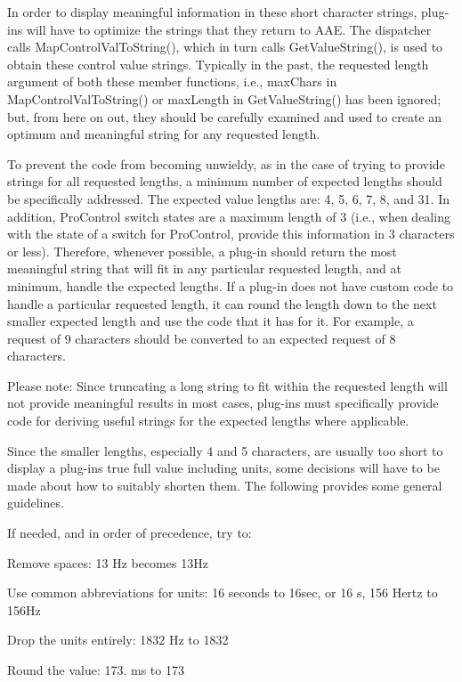 In order to display meaningful information in these short character strings, plug-\/ins will have to optimize the strings that they return to A\+AE. The dispatcher calls Map\+Control\+Val\+To\+String(), which in turn calls Get\+Value\+String(), is used to obtain these control value strings. Typically in the past, the requested length argument of both these member functions, i.\+e., max\+Chars in Map\+Control\+Val\+To\+String() or max\+Length in Get\+Value\+String() has been ignored; but, from here on out, they should be carefully examined and used to create an optimum and meaningful string for any requested length.

To prevent the code from becoming unwieldy, as in the case of trying to provide strings for all requested lengths, a minimum number of expected lengths should be specifically addressed. The expected value lengths are\+: 4, 5, 6, 7, 8, and 31. In addition, Pro\+Control switch states are a maximum length of 3 (i.\+e., when dealing with the state of a switch for Pro\+Control, provide this information in 3 characters or less). Therefore, whenever possible, a plug-\/in should return the most meaningful string that will fit in any particular requested length, and at minimum, handle the expected lengths. If a plug-\/in does not have custom code to handle a particular requested length, it can round the length down to the next smaller expected length and use the code that it has for it. For example, a request of 9 characters should be converted to an expected request of 8 characters.

Please note\+: Since truncating a long string to fit within the requested length will not provide meaningful results in most cases, plug-\/ins must specifically provide code for deriving useful strings for the expected lengths where applicable.

Since the smaller lengths, especially 4 and 5 characters, are usually too short to display a plug-\/in\textquotesingle{}s true full value including units, some decisions will have to be made about how to suitably shorten them. The following provides some general guidelines.

If needed, and in order of precedence, try to\+: 
\begin{DoxyItemize}
\item Remove spaces\+: 13 Hz becomes 13Hz 
\item Use common abbreviations for units\+: 16 seconds to 16sec, or 16 s, 156 Hertz to 156Hz  
\item Drop the units entirely\+: 1832 Hz to 1832 
\item Round the value\+: 173. ms to 173 
\end{DoxyItemize}

